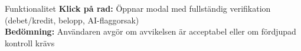 \documentclass[10pt]{beamer}
\begin{document}
\begin{frame}[label=bokanalys]
  \vspace{0.3cm}
  \begin{block}{Funktionalitet}
    \footnotesize
    \textbf{Klick på rad:} Öppnar modal med fullständig verifikation (debet/kredit, belopp, AI-flaggorsak)\\
    \textbf{Bedömning:} Användaren avgör om avvikelsen är acceptabel eller om fördjupad kontroll krävs
  \end{block}
  
  \vspace{0.5cm}
  \begin{flushright}
    \hyperlink{penningflodes}{}
  \end{flushright}
\end{frame}

\end{document}
